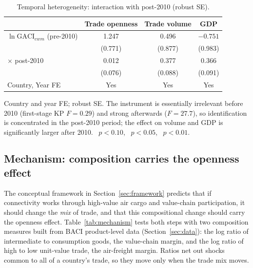 \begin{table}[ht!]
\centering
\caption{Temporal heterogeneity: interaction with post-2010 (robust SE).}
\label{tab:temporal}
\begin{threeparttable}
\small
\begin{tabular}{lccc}
\toprule
 & Trade openness & Trade volume & GDP \\
\midrule
$\ln\mathrm{GACI}_{cwm}$ (pre-2010) & 1.247   & 0.496   & $-0.751$ \\
                        & (0.771) & (0.877) & (0.983) \\
$\times$ post-2010      & 0.012   & 0.377\sym{***} & 0.366\sym{***} \\
                        & (0.076) & (0.088) & (0.091) \\
\midrule
Country, Year FE        & Yes & Yes & Yes \\
\bottomrule
\end{tabular}
\begin{tablenotes}\footnotesize
\item Country and year FE; robust SE. The instrument is essentially irrelevant
before 2010 (first-stage KP $F=0.29$) and strong afterwards ($F=27.7$), so
identification is concentrated in the post-2010 period; the effect on volume
and GDP is significantly larger after 2010.
\sym{*}~$p<0.10$, \sym{**}~$p<0.05$, \sym{***}~$p<0.01$.
\end{tablenotes}
\end{threeparttable}
\end{table}

\subsection{Mechanism: composition carries the openness effect}
\label{sec:mechanism}
\label{sec:mediation}
The conceptual framework in Section~\ref{sec:framework} predicts that if
connectivity works through high-value air cargo and value-chain
participation, it should change the \emph{mix} of trade, and that this
compositional change should carry the openness effect.
Table~\ref{tab:mechanism} tests both steps with two composition measures
built from BACI product-level data (Section~\ref{sec:data}): the log
ratio of intermediate to consumption goods, the value-chain margin, and
the log ratio of high to low unit-value trade, the air-freight margin.
Ratios net out shocks common to all of a country's trade, so they move
only when the trade mix moves.

